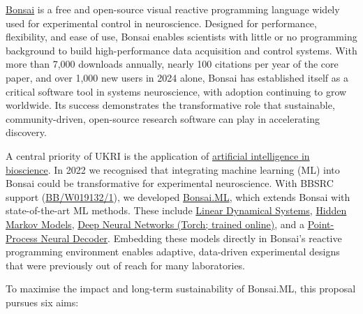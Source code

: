 \href{https://bonsai-rx.org/}{Bonsai} is a free and open-source visual reactive
programming language widely used for experimental control in neuroscience.
Designed for performance, flexibility, and ease of use, Bonsai enables
scientists with little or no programming background to build high-performance
data acquisition and control systems. With more than 7,000 downloads annually,
nearly 100 citations per year of the core paper, and over 1,000 new users in
2024 alone, Bonsai has established itself as a critical software tool in
systems neuroscience, with adoption continuing to grow worldwide. Its success demonstrates the transformative role that
sustainable, community-driven, open-source research software can play in accelerating
discovery.

A central priority of UKRI is the application of
\href{https://www.ukri.org/what-we-do/browse-our-areas-of-investment-and-support/artificial-intelligence-in-bioscience/}{artificial
intelligence in bioscience}. In 2022 we recognised that integrating machine
learning (ML) into Bonsai could be transformative for experimental
neuroscience. With BBSRC support
(\href{https://gow.bbsrc.ukri.org/grants/AwardDetails.aspx?FundingReference=BB%2FW019132%2F1}{BB/W019132/1}),
we developed \href{https://bonsai-rx.org/machinelearning/}{Bonsai.ML}, which
extends Bonsai with state-of-the-art ML methods. These include
\href{https://bonsai-rx.org/machinelearning/examples/examples/LinearDynamicalSystems/README.html}{Linear
Dynamical Systems},
\href{https://bonsai-rx.org/machinelearning/examples/examples/HiddenMarkovModels/README.html}{Hidden
Markov Models},
\href{https://bonsai-rx.org/machinelearning/examples/examples/Torch/NeuralNetsTrainedOnline/README.html}{Deep
Neural Networks (Torch; trained online)}, and a
\href{https://bonsai-rx.org/machinelearning/examples/examples/PointProcessDecoder/DecodePositionFromHippocampusSortedUnits/README.html}{Point-Process Neural
Decoder}. Embedding these models directly in Bonsai’s reactive programming
environment enables adaptive, data-driven experimental designs that were
previously out of reach for many laboratories.  

To maximise the impact and long-term sustainability of Bonsai.ML, this proposal
pursues six aims:  

